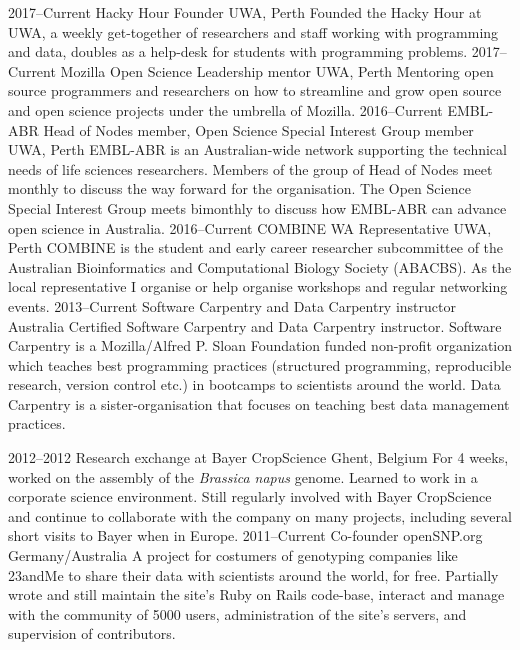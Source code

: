 \documentclass[]{friggeri-cv} %
\begin{document}
\begin{entrylist}
\entry
{2017--Current}
{Hacky Hour Founder}
{UWA, Perth}
{Founded the Hacky Hour at UWA, a weekly get-together of researchers and staff working with programming and data, doubles as a help-desk for students with programming problems.}
\entry
{2017--Current}
{Mozilla Open Science Leadership mentor}
{UWA, Perth}
{Mentoring open source programmers and researchers on how to streamline and grow open source and open science projects under the umbrella of Mozilla.}
\entry
{2016--Current}
{EMBL-ABR Head of Nodes member, Open Science Special Interest Group member}
{UWA, Perth}
{EMBL-ABR is an Australian-wide network supporting the technical needs of life sciences researchers. Members of the group of Head of Nodes meet monthly to discuss the way forward for the organisation. The Open Science Special Interest Group meets bimonthly to discuss how EMBL-ABR can advance open science in Australia.}
\entry
{2016--Current}
{COMBINE WA Representative}
{UWA, Perth}
{COMBINE is the student and early career researcher subcommittee of the Australian Bioinformatics and Computational Biology Society (ABACBS). As the local representative I organise or help organise workshops and regular networking events.}
\entry
{2013--Current}
{Software Carpentry and Data Carpentry instructor}
{Australia}
{Certified Software Carpentry and Data Carpentry instructor. Software Carpentry is a Mozilla/Alfred P. Sloan Foundation funded non-profit organization which teaches best programming practices (structured programming, reproducible research, version control etc.) in bootcamps to scientists around the world. Data Carpentry is a sister-organisation that focuses on teaching best data management practices.}
\end{entrylist}
\begin{entrylist}
\entry
{2012--2012}
{Research exchange {\normalfont at Bayer CropScience}}
{Ghent, Belgium}
{For 4 weeks, worked on the assembly of the \textit{Brassica napus} genome. Learned to work in a corporate science environment. Still regularly involved with Bayer CropScience and continue to collaborate with the company on many projects, including several short visits to Bayer when in Europe.}
\entry
{2011--Current}
{Co-founder openSNP.org}
{Germany/Australia}
{A project for costumers of genotyping companies like 23andMe to share their data with scientists around the world, for free. Partially wrote and still maintain the site's Ruby on Rails code-base, interact and manage with the community of 5000 users, administration of the site's servers, and supervision of contributors.}


\end{entrylist}
\end{document}
